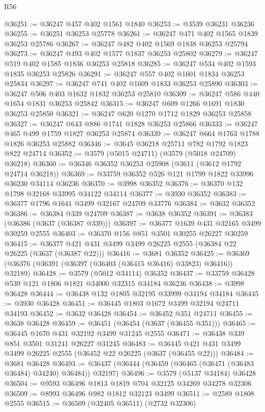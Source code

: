 \begin{lexlean}{R56}
\begin{coremodule}
@36251 := @36247 @457 @402 @1561 @1840
@36253 := @3539 @36231 @36236
@36255 := @36251 @36253 @25778
@36261 := @36247 @471 @402 @1565 @1839 @36253 @25786
@36267 := @36247 @482 @402 @1569 @1838 @36253 @25794
@36273 := @36247 @493 @402 @1577 @1837 @36253 @25802
@36279 := @36247 @519 @402 @1585 @1836 @36253 @25818
@36285 := @36247 @534 @402 @1593 @1835 @36253 @25826
@36291 := @36247 @557 @402 @1601 @1834 @36253 @25834
@36297 := @36247 @741 @402 @1609 @1833 @36253 @25890
@36303 := @36247 @506 @403 @1632 @1832 @36253 @25810
@36309 := @36247 @586 @440 @1654 @1831 @36253 @25842
@36315 := @36247 @609 @1266 @1691 @1830 @36253 @25850
@36321 := @36247 @620 @1270 @1712 @1829 @36253 @25858
@36327 := @36247 @643 @886 @1741 @1828 @36253 @25866
@36333 := @36247 @465 @499 @1759 @1827 @36253 @25874
@36339 := @36247 @664 @1763 @1788 @1826 @36253 @25882
@36346 := @3645 @36218 @25711 @782 @1792 @1823 @822 @24714
@36352 := @3579 (@5015 @24711) (@3579 (@5018 @24709) @36218)
@36360 := @36346 @36352 @36253 @25908 (@3611 (@3612 @1792 @24714 @36218))
@36369 := @33759 @36352 @526 @121 @1799 @1822 @33996 @36230 @34114 @36236
@36370 := @3998 @36352
@36376 := @36370 @132 @1798 @32168 @33995 @34122 @34114
@36377 := @3930 @36352
@36383 := @36377 @1796 @1641 @3499 @32167 @24709 @33776
@36384 := @3632 @36352
@36386 := @36384 @339 @24709
@36387 := @3638 @36352
@36391 := @36383 (@36386 (@3637 (@36387 @339)))
@36397 := @36377 @1639 @431 @32165 @3499 @30259 @2555
@36403 := @36370 @156 @851 @3501 @30255 @26227 @30259
@36415 := @36377 @421 @431 @3499 @3499 @26225 @2555 (@36384 @22 @26225 (@3637 (@36387 @22)))
@36416 := @3681 @36352
@36425 := @36369 (@36376 (@36391 (@36397 (@36403 (@36415 @36416) @33823) @36416)) @32189)
@36428 := @3579 (@5012 @34114) @36352
@36437 := @33759 @36428 @539 @121 @1806 @1821 @34000 @32315 @34184 @36236
@36438 := @3998 @36428
@36444 := @36438 @132 @1805 @32195 @33999 @34194 @34184
@36445 := @3930 @36428
@36451 := @36445 @1803 @1672 @3499 @32194 @24711 @34193
@36452 := @3632 @36428
@36454 := @36452 @351 @24711
@36455 := @3638 @36428
@36459 := @36451 (@36454 (@3637 (@36455 @351)))
@36465 := @36445 @1670 @431 @32192 @3499 @31245 @2555
@36471 := @36438 @339 @851 @3501 @31241 @26227 @31245
@36483 := @36445 @421 @431 @3499 @3499 @26225 @2555 (@36452 @22 @26225 (@3637 (@36455 @22)))
@36484 := @3681 @36428
@36493 := @36437 (@36444 (@36459 (@36465 (@36471 (@36483 @36484) @34240) @36484)) @32197)
@36496 := @3579 (@5137 @34184) @36428
@36504 := @9593 @36496 @1813 @1819 @704 @32125 @34269 @34278 @32306
@36509 := @8993 @36496 @982 @1812 @32123 @3499
@36511 := @2589 @1808 @2555
@36515 := @36509 (@32405 @36511) (@2732 @32306)

\end{coremodule}
\end{lexlean}
